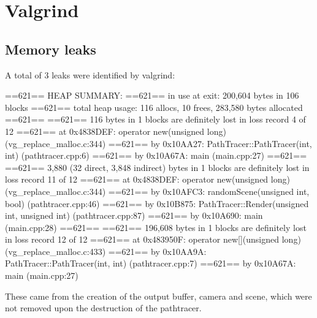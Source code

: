 \documentclass[12pt]{article}
\begin{document}
\section*{Valgrind}
\subsection*{Memory leaks}

A total of 3 leaks were identified by valgrind:

==621== HEAP SUMMARY:
==621==     in use at exit: 200,604 bytes in 106 blocks
==621==   total heap usage: 116 allocs, 10 frees, 283,580 bytes allocated
==621== 
==621== 116 bytes in 1 blocks are definitely lost in loss record 4 of 12
==621==    at 0x4838DEF: operator new(unsigned long) (vg_replace_malloc.c:344)
==621==    by 0x10AA27: PathTracer::PathTracer(int, int) (pathtracer.cpp:6)
==621==    by 0x10A67A: main (main.cpp:27)
==621== 
==621== 3,880 (32 direct, 3,848 indirect) bytes in 1 blocks are definitely lost in loss record 11 of 12
==621==    at 0x4838DEF: operator new(unsigned long) (vg_replace_malloc.c:344)
==621==    by 0x10AFC3: randomScene(unsigned int, bool) (pathtracer.cpp:46)
==621==    by 0x10B875: PathTracer::Render(unsigned int, unsigned int) (pathtracer.cpp:87)
==621==    by 0x10A690: main (main.cpp:28)
==621== 
==621== 196,608 bytes in 1 blocks are definitely lost in loss record 12 of 12
==621==    at 0x483950F: operator new[](unsigned long) (vg_replace_malloc.c:433)
==621==    by 0x10AA9A: PathTracer::PathTracer(int, int) (pathtracer.cpp:7)
==621==    by 0x10A67A: main (main.cpp:27)

These came from the creation of the output buffer, camera and scene, which were not removed upon the destruction of the pathtracer.
\end{document}
